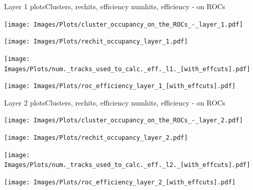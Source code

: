 \documentclass{beamer}
\begin{document}
\begin{frame}{Layer 1 plots}{Clusters, rechits, efficiency numhits, efficiency - on ROCs}
  \hspace{0.01\textwidth}%
  \begin{minipage}{0.45\textwidth}
    \centering
    \texttt{[image: Images/Plots/cluster\_occupancy\_on\_the\_ROCs\_-\_layer\_1.pdf]}
  \end{minipage}%
  \hspace{0.01\textwidth}%
  \begin{minipage}{0.45\textwidth}
    \centering
    \texttt{[image: Images/Plots/rechit\_occupancy\_layer\_1.pdf]}
  \end{minipage}
  \vspace*{0.2cm}
  \begin{minipage}{0.45\textwidth}
    \centering
    \texttt{[image: Images/Plots/num.\_tracks\_used\_to\_calc.\_eff.\_l1.\_[with\_effcuts].pdf]}
  \end{minipage}%
  \hspace{0.01\textwidth}%
  \begin{minipage}{0.45\textwidth}
    \centering
    \texttt{[image: Images/Plots/roc\_efficiency\_layer\_1\_[with\_effcuts].pdf]}
  \end{minipage}
\end{frame}

\begin{frame}{Layer 2 plots}{Clusters, rechits, efficiency numhits, efficiency - on ROCs}
  \hspace{0.01\textwidth}%
  \begin{minipage}{0.45\textwidth}
    \centering
    \texttt{[image: Images/Plots/cluster\_occupancy\_on\_the\_ROCs\_-\_layer\_2.pdf]}
  \end{minipage}%
  \hspace{0.01\textwidth}%
  \begin{minipage}{0.45\textwidth}
    \centering
    \texttt{[image: Images/Plots/rechit\_occupancy\_layer\_2.pdf]}
  \end{minipage}
  \vspace*{0.2cm}
  \begin{minipage}{0.45\textwidth}
    \centering
    \texttt{[image: Images/Plots/num.\_tracks\_used\_to\_calc.\_eff.\_l2.\_[with\_effcuts].pdf]}
  \end{minipage}%
  \hspace{0.01\textwidth}%
  \begin{minipage}{0.45\textwidth}
    \centering
    \texttt{[image: Images/Plots/roc\_efficiency\_layer\_2\_[with\_effcuts].pdf]}
  \end{minipage}
\end{frame}
\end{document}
